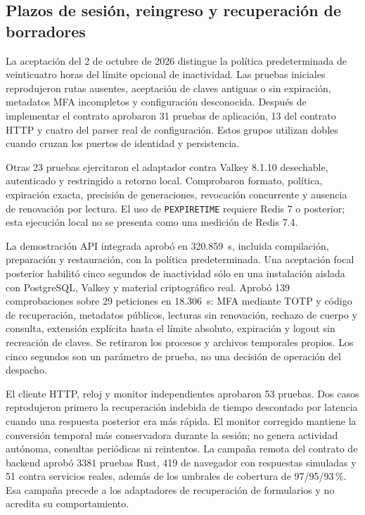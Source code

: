 \subsection{Plazos de sesión, reingreso y recuperación de borradores}\label{sec:pruebas-sesiones}

La aceptación del 2 de octubre de 2026 distingue la política predeterminada
de veinticuatro horas del límite opcional de inactividad. Las pruebas iniciales
reprodujeron rutas ausentes, aceptación de claves antiguas o sin expiración,
metadatos MFA incompletos y configuración desconocida. Después de implementar
el contrato aprobaron 31 pruebas de aplicación, 13 del contrato HTTP y cuatro
del parser real de configuración. Estos grupos utilizan dobles cuando cruzan
los puertos de identidad y persistencia.

Otras 23 pruebas ejercitaron el adaptador contra Valkey 8.1.10 desechable,
autenticado y restringido a retorno local. Comprobaron formato, política,
expiración exacta, precisión de generaciones, revocación concurrente y ausencia
de renovación por lectura. El uso de \texttt{PEXPIRETIME} requiere Redis 7 o
posterior; esta ejecución local no se presenta como una medición de Redis 7.4.

La demostración API integrada aprobó en 320.859~s, incluida compilación,
preparación y restauración, con la política predeterminada. Una aceptación
focal posterior habilitó cinco segundos de inactividad sólo en una instalación
aislada con PostgreSQL, Valkey y material criptográfico real. Aprobó
139 comprobaciones sobre 29 peticiones en 18.306~s: MFA mediante TOTP y código
de recuperación, metadatos públicos, lecturas sin renovación, rechazo de cuerpo
y consulta, extensión explícita hasta el límite absoluto, expiración y logout
sin recreación de claves. Se retiraron los procesos y archivos temporales
propios. Los cinco segundos son un parámetro de prueba, no una decisión de
operación del despacho.

El cliente HTTP, reloj y monitor independientes aprobaron 53 pruebas.
Dos casos reprodujeron primero la recuperación indebida de tiempo descontado
por latencia cuando una respuesta posterior era más rápida. El monitor
corregido mantiene la conversión temporal más conservadora durante la sesión;
no genera actividad autónoma, consultas periódicas ni reintentos. La campaña
remota del contrato de backend aprobó 3381 pruebas Rust, 419 de navegador con
respuestas simuladas y 51 contra servicios reales, además de los umbrales de
cobertura de 97/95/93\,\%. Esa campaña precede a los adaptadores de recuperación
de formularios y no acredita su comportamiento.

